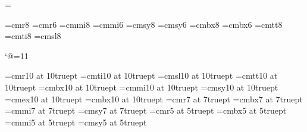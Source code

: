 \magnification=
\nopagenumbers


\font\eightrm=cmr8  \font\sixrm=cmr6
\font\eighti=cmmi8  \font\sixi=cmmi6
\font\eightsy=cmsy8 \font\sixsy=cmsy6
\font\eightbf=cmbx8 \font\sixbf=cmbx6
\font\eighttt=cmtt8
\font\eightit=cmti8
\font\eightsl=cmsl8

\catcode`@=11
\newskip\ttglue

\def\tenpoint{\def\rm{\fam0\tenrm}%
  \textfont0=\tenrm \scriptfont0=\sevenrm \scriptscriptfont0=\fiverm
  \textfont1=\teni  \scriptfont1=\seveni  \scriptscriptfont1=\fivei
  \textfont2=\tensy \scriptfont2=\sevensy \scriptscriptfont2=\fivesy
  \textfont3=\tenex  \scriptfont3=\tenex   \scriptscriptfont3=\tenex
  \textfont\itfam=\tenit  \def\it{\fam\itfam\tenit}%
  \textfont\slfam=\tensl  \def\sl{\fam\slfam\tensl}%
  \textfont\ttfam=\tentt  \def\tt{\fam\ttfam\tentt}%
  \textfont\bffam=\tenbf  \scriptfont\bffam=\sevenbf
   \scriptscriptfont\bffam=\fivebf  \def\bf{\fam\bffam\tenbf}%
  \tt \ttglue=.5em plus.25em minus.15em
  \normalbaselineskip=12pt
  \setbox\strutbox=\hbox{\vrule height8.5pt depth3.5pt width0pt}%
  \let\sc=\eightrm \let\big=\tenbig \normalbaselines\rm}

\font\ttenrm=cmr10 at 10truept
\font\ttenit=cmti10 at 10truept
\font\ttensl=cmsl10 at 10truept
\font\ttentt=cmtt10 at 10truept
\font\ttenbf=cmbx10 at 10truept
\font\tteni=cmmi10 at 10truept
\font\ttensy=cmsy10 at 10truept
\font\ttenex=cmex10 at 10truept
\font\ttenbf=cmbx10 at 10truept
\font\tsevenrm=cmr7 at 7truept
\font\tsevenbf=cmbx7 at 7truept
\font\tseveni=cmmi7 at 7truept
\font\tsevensy=cmsy7 at 7truept
\font\tfiverm=cmr5 at 5truept
\font\tfivebf=cmbx5 at 5truept
\font\tfivei=cmmi5 at 5truept
\font\tfivesy=cmsy5 at 5truept

\def\ttenpoint{\def\rm{\fam0\ttenrm}%
  \textfont0=\ttenrm \scriptfont0=\tsevenrm \scriptscriptfont0=\tfiverm
  \textfont1=\tteni  \scriptfont1=\tseveni  \scriptscriptfont1=\tfivei
  \textfont2=\ttensy \scriptfont2=\tsevensy \scriptscriptfont2=\tfivesy
  \textfont3=\ttenex  \scriptfont3=\ttenex   \scriptscriptfont3=\ttenex
  \textfont\itfam=\ttenit  \def\it{\fam\itfam\ttenit}%
  \textfont\slfam=\ttensl  \def\sl{\fam\slfam\ttensl}%
  \textfont\ttfam=\ttentt  \def\tt{\fam\ttfam\ttentt}%
  \textfont\bffam=\ttenbf  \scriptfont\bffam=\tsevenbf
   \scriptscriptfont\bffam=\tfivebf  \def\bf{\fam\bffam\ttenbf}%
  \tt \ttglue=.5em plus.25em minus.15em
  \normalbaselineskip=12truept \normallineskip=1truept
     \normallineskiplimit=0truept
  \setbox\strutbox=\hbox{\vrule height8.5truept depth3.5truept width0truept}%
  \let\sc=\eightrm \let\big=\tenbig \normalbaselines\rm}


